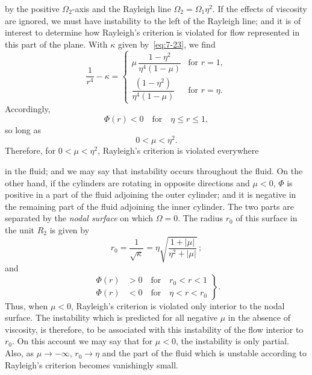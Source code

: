 by the positive $\Omega_2$-axis and the Rayleigh line $\Omega_2 = \Omega_1 \eta^2$.  If the effects
of viscosity are ignored, we must have instability to the left of the
Rayleigh line; and it is of interest to determine how Rayleigh's criterion
is violated for flow represented in this part of the plane.  With $\kappa$ given
by~\eqref{eq:7-23}, we find
\begin{equation}
\label{eq:7-26}
\frac{1}{r^4} - \kappa = \begin{cases}
\mu\,\dfrac{1-\eta^2}{\eta^4(1-\mu)} & \text{for } r = 1,\\[6pt]
\dfrac{(1-\eta^2)}{\eta^4(1-\mu)} & \text{for } r = \eta.
\end{cases}
\end{equation}
Accordingly,
\begin{equation}
\label{eq:7-27}
\Phi(r) < 0 \quad \text{for} \quad \eta \leqslant r \leqslant 1,
\end{equation}
so long as
\begin{equation}
\label{eq:7-28}
0 < \mu < \eta^2.
\end{equation}
Therefore, for $0 < \mu < \eta^2$, Rayleigh's criterion is violated everywhere


in the fluid; and we may say that instability occurs throughout the
fluid.  On the other hand, if the cylinders are rotating in opposite
directions and $\mu < 0$, $\Phi$ is positive in a part of the fluid adjoining the
outer cylinder; and it is negative in the remaining part of the fluid
adjoining the inner cylinder.  The two parts are separated by the \emph{nodal
surface} on which $\Omega = 0$.  The radius $r_0$ of this surface in the unit $R_2$ is
given by
\begin{equation}
\label{eq:7-29}
r_0 = \frac{1}{\sqrt{\kappa}} = \eta\sqrt{\frac{1+|\mu|}{{\eta^2}+|\mu|}}\,;
\end{equation}
and
\begin{equation}
\label{eq:7-30}
\left.\begin{aligned}
\Phi(r) &> 0 \quad \text{for} \quad r_0 < r < 1\\
\Phi(r) &< 0 \quad \text{for} \quad \eta < r < r_0
\end{aligned}\right\}.
\end{equation}
Thus, when $\mu < 0$, Rayleigh's criterion is violated only interior to the
nodal surface.  The instability which is predicted for all negative $\mu$ in
the absence of viscosity, is therefore, to be associated with this instability
of the flow interior to $r_0$.  On this account we may say that for $\mu < 0$,
the instability is only partial.  Also, as $\mu \to -\infty$, $r_0 \to \eta$ and the part
of the fluid which is unstable according to Rayleigh's criterion becomes
vanishingly small.


